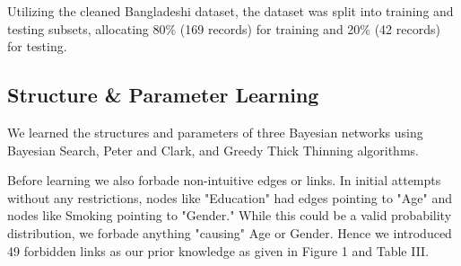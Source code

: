 \documentclass[conference]{IEEEtran}
\begin{document}
Utilizing the cleaned Bangladeshi dataset, the dataset was split into training and testing subsets, allocating 80\% (169 records) for training and 20\% (42 records) for testing. 

\begin{table}[h!]
\centering
\caption{Cleaning strings for Structure \& Parameter Learning}
\label{tab:preprocessing_steps}
\end{table}

\subsection{Structure \& Parameter Learning}
We learned the structures and parameters of three Bayesian networks using Bayesian Search, Peter and Clark, and Greedy Thick Thinning algorithms. 

Before learning we also forbade non-intuitive edges or links. In initial attempts without any restrictions, nodes like "Education" had edges pointing to "Age" and nodes like Smoking pointing to "Gender." While this could be a valid probability distribution, we forbade anything "causing" Age or Gender. Hence we introduced 49 forbidden links as our prior knowledge as given in Figure 1 and Table III.
\end{document}
